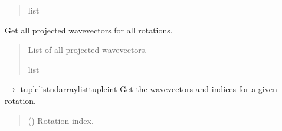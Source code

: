 \documentclass[letterpaper,10pt,english]{sphinxmanual}
\begin{document}
\begin{fulllineitems}
\begin{fulllineitems}
\begin{quote}
\begin{description}
\sphinxAtStartPar
list

\end{description}\end{quote}

\end{fulllineitems}


\begin{fulllineitems}
\label{\detokenize{source/Illumination:Illumination.Illumination.get_all_wavevectors_projected}}
\pysigstartsignatures
\pysiglinewithargsret
{}
{}
{}
\pysigstopsignatures
\sphinxAtStartPar
Get all projected wavevectors for all rotations.
\begin{quote}\begin{description}
\sphinxAtStartPar
List of all projected wavevectors.

\sphinxAtStartPar
list

\end{description}\end{quote}

\end{fulllineitems}


\begin{fulllineitems}
\label{\detokenize{source/Illumination:Illumination.Illumination.get_wavevectors}}
\pysigstartsignatures
\pysiglinewithargsret
{}
{}
{{ $\rightarrow$ tuple\DUrole{p}{{[}}list\DUrole{p}{{[}}ndarray\DUrole{p}{{]}}list\DUrole{p}{{[}}tuple\DUrole{p}{{[}}int\DUrole{p}{{]}}\DUrole{p}{{]}}\DUrole{p}{{]}}}}
\pysigstopsignatures
\sphinxAtStartPar
Get the wavevectors and indices for a given rotation.
\begin{quote}\begin{description}
\sphinxAtStartPar
{} () \textendash{} Rotation index.


\end{description}
\end{quote}
\end{fulllineitems}
\end{fulllineitems}
\end{document}
